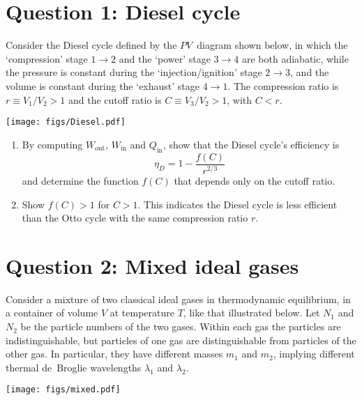 \documentclass[12 pt]{article} %
\newcommand{\la}{\ensuremath{\lambda} }
\newcommand{\showmarks}[1]{\rightline{\texttt{[#1 marks]}}} %
\begin{document}
\newpage
\section*{Question 1: Diesel cycle}
Consider the Diesel cycle defined by the $PV$~diagram shown below, in which the `compression' stage $1 \to 2$ and the `power' stage $3 \to 4$ are both adiabatic, while the pressure is constant during the `injection/ignition' stage $2 \to 3$, and the volume is constant during the `exhaust' stage $4 \to 1$.
The compression ratio is $r \equiv V_1 / V_2 > 1$ and the cutoff ratio is $C \equiv V_3 / V_2 > 1$, with $C < r$.

\begin{center}\texttt{[image: figs/Diesel.pdf]}\end{center}

\begin{enumerate}[label={(\alph*)}]
  \item By computing $W_{\text{out}}$, $W_{\text{in}}$ and $Q_{\text{in}}$, show that the Diesel cycle's efficiency is
        \begin{equation*}
          \eta_D = 1 - \frac{f(C)}{r^{2 / 3}}
        \end{equation*}
        and determine the function $f(C)$ that depends only on the cutoff ratio.

  \showmarks{18}

  \item Show $f(C) > 1$ for $C > 1$.
        This indicates the Diesel cycle is less efficient than the Otto cycle with the same compression ratio $r$.

  \showmarks{6}
\end{enumerate}



\newpage
\section*{Question 2: Mixed ideal gases}
Consider a mixture of two classical ideal gases in thermodynamic equilibrium, in a container of volume $V$ at temperature $T$, like that illustrated below.
Let $N_1$ and $N_2$ be the particle numbers of the two gases.
Within each gas the particles are indistinguishable, but particles of one gas are distinguishable from particles of the other gas.
In particular, they have different masses $m_1$ and $m_2$, implying different thermal de~Broglie wavelengths $\la_1$ and $\la_2$. \\[-24 pt]
\begin{center}\texttt{[image: figs/mixed.pdf]}\end{center}
\vspace{-12 pt}
\end{document}
